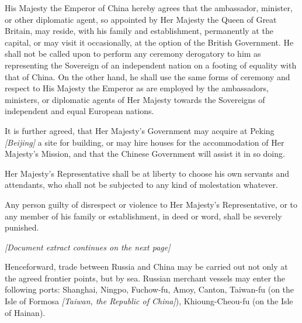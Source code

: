 \begin{fancyquote}
	\vspace*{0.5em}
	\vspace*{0.5em}
	
	His Majesty the Emperor of China hereby agrees that the ambassador, minister, or other diplomatic agent, so appointed by Her Majesty the Queen of Great Britain, may reside, with his family and establishment, permanently at the capital, or may visit it occasionally, at the option of the British Government. He shall not be called upon to perform any ceremony derogatory to him as representing the Sovereign of an independent nation on a footing of equality with that of China. On the other hand, he shall use the same forms of ceremony and respect to His Majesty the Emperor as are employed by the ambassadors, ministers, or diplomatic agents of Her Majesty towards the Sovereigns of independent and equal European nations.
	
	It is further agreed, that Her Majesty's Government may acquire at Peking \emph{[Beijing]} a site for building, or may hire houses for the accommodation of Her Majesty's Mission, and that the Chinese Government will assist it in so doing.
	
	Her Majesty's Representative shall be at liberty to choose his own servants and attendants, who shall not be subjected to any kind of molestation whatever.
	
	Any person guilty of disrespect or violence to Her Majesty's Representative, or to any member of his family or establishment, in deed or word, shall be severely punished. \emph{\autocite{HKPress:1912}}
	\begin{center}
		\vspace*{1em}
		\emph{[Document extract continues on the next page]}
	\end{center}
	
	\clearpage
	
	Henceforward, trade between Russia and China may be carried out not only at the agreed frontier points, but by sea. Russian merchant vessels may enter the following ports: Shanghai, Ningpo, Fuchow-fu, Amoy, Canton, Taiwan-fu (on the Isle of Formosa \emph{[Taiwan, the Republic of China]}), Khioung-Cheou-fu (on the Isle of Hainan).
	\emph{\autocite{Adamov:1952}}
	
	

\end{fancyquote}
